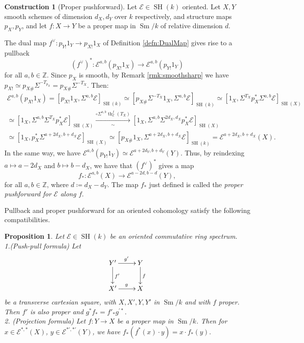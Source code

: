 \documentclass[10pt]{amsart}
\theoremstyle{definition}
\newtheorem{constr}[defn]{Construction}
\theoremstyle{plain}
\newtheorem{prop}[defn]{Proposition}
\numberwithin{equation}{section}
\newcommand{\0}{\emptyset}
\newcommand{\sE}{{\mathcal E}}
\newcommand{\Z}{{\mathbb Z}}
\newcommand{\SH}{{\operatorname{SH}}}
\newcommand{\Sm}{{\operatorname{Sm}}}
\renewcommand{\th}{{\operatorname{th}}}
\begin{document}
\begin{constr}[Proper pushforward]
\label{constr:properpushforward}
    Let $\sE \in \SH(k)$ oriented. Let $X,Y$ smooth schemes of dimension $d_X,d_Y$ over $k$ respectively, and structure maps $p_X,p_Y$, and let $f:X \to Y$ be a proper map in $\Sm/k$ of relative dimension $d$.
    
    The dual map $f^\vee:p_{Y!}1_Y \to p_{X!}1_X$ of Definition \ref{defn:DualMap} gives rise to a pullback
    $$(f^\vee)^*:\sE^{a,b}(p_{X!}1_X) \to \sE^{a,b}(p_{Y!}1_Y)$$
    for all $a,b \in \Z$. Since $p_X$ is smooth, by Remark \ref{rmk:smoothsharp} we have $p_{X!}\simeq p_{X\#}\Sigma^{-T_{p_X}}=p_{X\#}\Sigma^{-T_X}$. Then:
    \begin{multline*}
        \sE^{a,b}(p_{X!}1_X) = [p_{X!}1_X,\Sigma^{a,b}\sE]_{\SH(k)} \simeq [p_{X\#}\Sigma^{-T_X}1_X, \Sigma^{a,b}\sE]_{\SH(k)} \simeq [1_X,\Sigma^{T_X}p_X^*\Sigma^{a,b}\sE]_{\SH(X)} \\ \simeq [1_X,\Sigma^{a,b}\Sigma^{T_X}p_X^*\sE]_{\SH(X)} \xrightarrow[\sim]{\circ \Sigma^{a,b}\th_{\sE}^f(T_X)}[1_X,\Sigma^{a,b}\Sigma^{2d_X,d_X}p_X^*\sE]_{\SH(X)} \\ \simeq [1_X,p_X^*\Sigma^{a+2d_X,b+d_X}\sE]_{\SH(X)} \simeq [p_{X\#}1_X,\Sigma^{a+2d_X,b+d_X}\sE]_{\SH(k)}=\sE^{a+2d_X,b+d_X}(X).
    \end{multline*}
    In the same way, we have $\sE^{a,b}(p_{Y!}1_Y) \simeq \sE^{a+2d_Y,b+d_Y}(Y).$ Thus, by reindexing $a \mapsto a-2d_X$ and $b \mapsto b- d_X$, we have that $(f^\vee)^*$ gives a map
    $$f_*:\sE^{a,b}(X) \to \sE^{a-2d,b-d}(Y),$$
    for all $a,b \in \Z$, where $d \coloneqq d_X-d_Y$. The map $f_*$ just defined is called the \emph{proper pushforward for $\sE$ along $f$}.
\end{constr}

Pullback and proper pushforward for an oriented cohomology 
satisfy the following compatibilities.

\begin{prop}\label{prop:PushPull} Let $\sE\in \SH(k)$ be an oriented commutative ring spectrum.\\[5pt]
1.(Push-pull formula) Let
\[
\xymatrix{
Y'\ar[r]^{g'}\ar[d]^{f'}&Y\ar[d]^f\\
X'\ar[r]^g&X
}
\]
be a transverse cartesian square, with $X,X', Y,Y'$ in $\Sm/k$ and with $f$ proper. Then $f'$ is also proper and $g^*f_*=f'_*g^{\prime *}$.\\[2pt]
2. (Projection formula) Let $f:Y\to X$ be a proper map in $\Sm/k$. Then for $x\in \sE^{*,*}(X)$, $y\in \sE^{*',*'}(Y)$, we have $f_*(f^*(x)\cdot y)=x\cdot f_*(y)$.
\end{prop}
\end{document}
